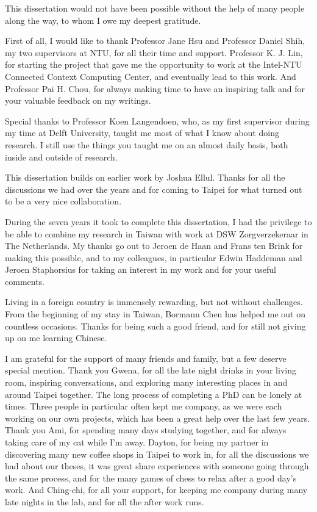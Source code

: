 \begin{acknowledgementsen}

This dissertation would not have been possible without the help of many people along the way, to whom I owe my deepest gratitude.

First of all, I would like to thank Professor Jane Hsu and Professor Daniel Shih, my two supervisors at NTU, for all their time and support. Professor K. J. Lin, for starting the project that gave me the opportunity to work at the Intel-NTU Connected Context Computing Center, and eventually lead to this work. And Professor Pai H. Chou, for always making time to have an inspiring talk and for your valuable feedback on my writings.

Special thanks to Professor Koen Langendoen, who, as my first supervisor during my time at Delft University, taught me most of what I know about doing research. I still use the things you taught me on an almost daily basis, both inside and outside of research. 

This dissertation builds on earlier work by Joshua Ellul. Thanks for all the discussions we had over the years and for coming to Taipei for what turned out to be a very nice collaboration.

During the seven years it took to complete this dissertation, I had the privilege to be able to combine my research in Taiwan with work at DSW Zorgverzekeraar in The Netherlands. My thanks go out to Jeroen de Haan and Frans ten Brink for making this possible, and to my colleagues, in particular Edwin Haddeman and Jeroen Staphorsius for taking an interest in my work and for your useful comments.

Living in a foreign country is immensely rewarding, but not without challenges. From the beginning of my stay in Taiwan, Bormann Chen has helped me out on countless occasions. Thanks for being such a good friend, and for still not giving up on me learning Chinese.

I am grateful for the support of many friends and family, but a few deserve special mention. Thank you Gwena, for all the late night drinks in your living room, inspiring conversations, and exploring many interesting places in and around Taipei together. The long process of completing a PhD can be lonely at times. Three people in particular often kept me company, as we were each working on our own projects, which has been a great help over the last few years. Thank you Ami, for spending many days studying together, and for always taking care of my cat while I'm away. Dayton, for being my partner in discovering many new coffee shops in Taipei to work in, for all the discussions we had about our theses, it was great share experiences with someone going through the same process, and for the many games of chess to relax after a good day's work. And Ching-chi, for all your support, for keeping me company during many late nights in the lab, and for all the after work runs.


\end{acknowledgementsen}
